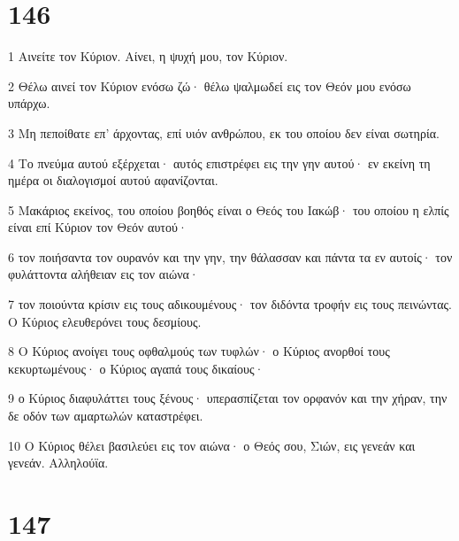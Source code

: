 \chapter{146}

\par 1 Αινείτε τον Κύριον. Αίνει, η ψυχή μου, τον Κύριον.
\par 2 Θέλω αινεί τον Κύριον ενόσω ζώ· θέλω ψαλμωδεί εις τον Θεόν μου ενόσω υπάρχω.
\par 3 Μη πεποίθατε επ' άρχοντας, επί υιόν ανθρώπου, εκ του οποίου δεν είναι σωτηρία.
\par 4 Το πνεύμα αυτού εξέρχεται· αυτός επιστρέφει εις την γην αυτού· εν εκείνη τη ημέρα οι διαλογισμοί αυτού αφανίζονται.
\par 5 Μακάριος εκείνος, του οποίου βοηθός είναι ο Θεός του Ιακώβ· του οποίου η ελπίς είναι επί Κύριον τον Θεόν αυτού·
\par 6 τον ποιήσαντα τον ουρανόν και την γην, την θάλασσαν και πάντα τα εν αυτοίς· τον φυλάττοντα αλήθειαν εις τον αιώνα·
\par 7 τον ποιούντα κρίσιν εις τους αδικουμένους· τον διδόντα τροφήν εις τους πεινώντας. Ο Κύριος ελευθερόνει τους δεσμίους.
\par 8 Ο Κύριος ανοίγει τους οφθαλμούς των τυφλών· ο Κύριος ανορθοί τους κεκυρτωμένους· ο Κύριος αγαπά τους δικαίους·
\par 9 ο Κύριος διαφυλάττει τους ξένους· υπερασπίζεται τον ορφανόν και την χήραν, την δε οδόν των αμαρτωλών καταστρέφει.
\par 10 Ο Κύριος θέλει βασιλεύει εις τον αιώνα· ο Θεός σου, Σιών, εις γενεάν και γενεάν. Αλληλούϊα.

\chapter{147}

